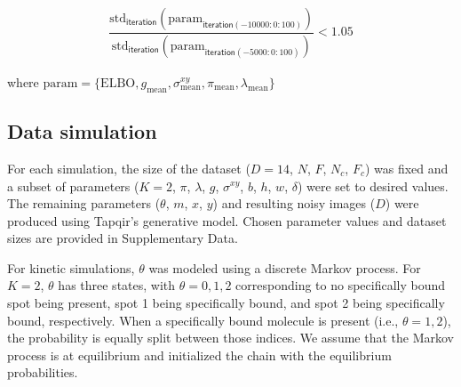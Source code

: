 \begin{subequations}
\begin{align}
    \dfrac{\mathrm{std}_\mathsf{iteration}(\mathrm{param}_{\mathsf{iteration}(-10000:0:100)})}{\mathrm{std}_\mathsf{iteration}(\mathrm{param}_{\mathsf{iteration}(-5000:0:100)})} < 1.05
\end{align}
\end{subequations}

\noindent where $\mathrm{param} = \{ \mathrm{ELBO}, g_\mathrm{mean}, \sigma^{xy}_\mathrm{mean}, \pi_\mathrm{mean}, \lambda_\mathrm{mean} \}$

\subsection*{Data simulation}

For each simulation, the size of the dataset ($D=14$, $N$, $F$, $N_c$, $F_c$) was fixed and a subset of parameters ($K=2$, $\pi$, $\lambda$, $g$, $\sigma^{xy}$, $b$, $h$, $w$, $\delta$) were set to desired values.  The remaining parameters ($\theta$, $m$, $x$, $y$) and resulting noisy images ($D$) were produced using Tapqir's generative model. Chosen parameter values and dataset sizes are provided in Supplementary Data.

For kinetic simulations, $\theta$ was modeled using a discrete Markov process. For $K=2$, $\theta$ has three states, with $\theta = 0, 1, 2$ corresponding to no specifically bound spot being present, spot 1 being specifically bound, and spot 2 being specifically bound, respectively. When a specifically bound molecule is present (i.e., $\theta = 1, 2$), the probability is equally split between those indices. We assume that the Markov process is at equilibrium and initialized the chain with the equilibrium probabilities.


